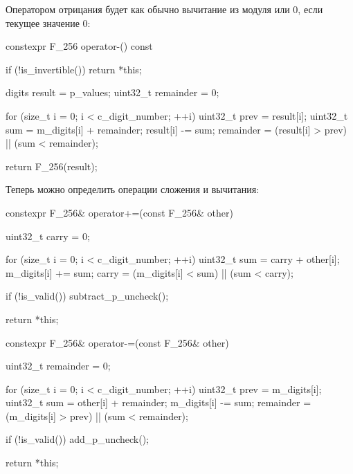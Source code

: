 Оператором отрицания будет как обычно вычитание из модуля или 0, если текущее значение 0:
\begin{cppcode}
constexpr F_256 operator-() const {
    if (!is_invertible()) {
        return *this;
    }

    digits result = p_values;
    uint32_t remainder = 0;

    for (size_t i = 0; i < c_digit_number; ++i) {
        uint32_t prev = result[i];
        uint32_t sum = m_digits[i] + remainder;
        result[i] -= sum;
        remainder = (result[i] > prev) || (sum < remainder);
    }

    return F_256(result);
}
\end{cppcode}
Теперь можно определить операции сложения и вычитания:
\begin{cppcode}
constexpr F_256& operator+=(const F_256& other) {
    uint32_t carry = 0;

    for (size_t i = 0; i < c_digit_number; ++i) {
        uint32_t sum = carry + other[i];
        m_digits[i] += sum;
        carry = (m_digits[i] < sum) || (sum < carry);
    }

    if (!is_valid()) {
        subtract_p_uncheck();
    }

    return *this;
}

constexpr F_256& operator-=(const F_256& other) {
    uint32_t remainder = 0;

    for (size_t i = 0; i < c_digit_number; ++i) {
        uint32_t prev = m_digits[i];
        uint32_t sum = other[i] + remainder;
        m_digits[i] -= sum;
        remainder = (m_digits[i] > prev) || (sum < remainder);
    }

    if (!is_valid()) {
        add_p_uncheck();
    }

    return *this;
}
\end{cppcode}
